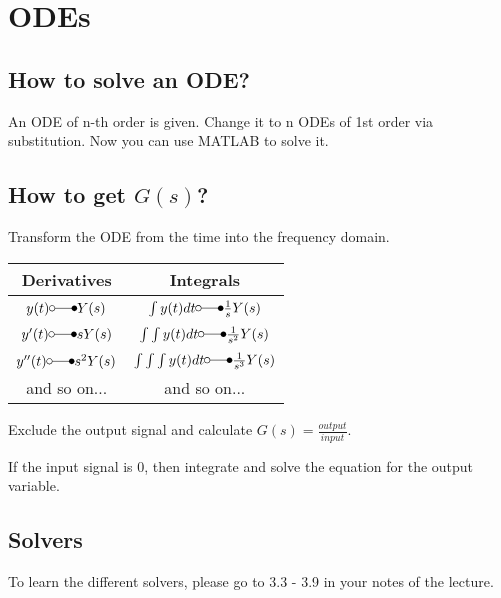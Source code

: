 \section{ODEs}

\subsection{How to solve an ODE?}

An ODE of n-th order is given. Change it to n ODEs of 1st order via substitution. Now you can use MATLAB to solve it.


\subsection{How to get $G(s)$?}

Transform the ODE from the time into the frequency domain.

\begin{tabular}{c|c}
	 Derivatives  & Integrals  \\ \hline
	 \(y(t) \laplace Y(s)\) 						&  \(\int y(t) dt \laplace \frac{1}{s} Y(s)\) \\
	 \(y^\prime (t) \laplace s Y(s)\)				&  \(\int\int y(t) dt \laplace \frac{1}{s^2} Y(s) \)  \\ 
	 \(y^{\prime\prime} (t) \laplace s^2 Y(s)\)  	&  \(\int\int\int y(t) dt \laplace \frac{1}{s^3} Y(s)\) \\
	 and so on... & and so on...
\end{tabular} 

Exclude the output signal and calculate $G(s)= \frac{output}{input}$. 


If the input signal is $0$, then integrate and solve the equation for the output variable.

\subsection{Solvers}

To learn the different solvers, please go to 3.3 - 3.9 in your notes of the lecture.
